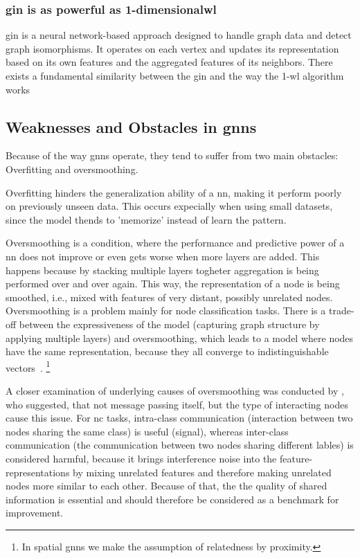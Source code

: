 \subsubsection{\ac{gin} is as powerful as 1-dimensional\ac{wl}}
\Ac{gin} is a neural network-based approach designed to handle graph data and detect graph isomorphisms. It operates on each vertex and updates its representation based on its own features and the aggregated features of its neighbors. There exists a fundamental similarity between the \ac{gin} and the way the 1-\ac{wl} algorithm works
\subsection{Weaknesses and Obstacles in \acp{gnn}}
\label{sec:related:pred:typical}
Because of the way \acp{gnn} operate, they tend to suffer from two main obstacles:
Overfitting and oversmoothing.

Overfitting hinders the generalization ability of a \acf{nn}, making it perform poorly
on previously unseen data. This occurs expecially when using small datasets, since the model thends to 'memorize' instead of learn the pattern.

Oversmoothing is a condition, where the performance and predictive power of a \ac{nn}
does not improve or even gets worse when more layers are added. This happens because
by stacking multiple layers  togheter aggregation is being performed over and over again.
This way, the representation of a node is being smoothed, i.e., mixed with features of
very distant, possibly unrelated nodes. Oversmoothing is a problem mainly for node classification tasks. There is a trade-off between the expressiveness of the model (capturing graph structure by applying multiple layers) and oversmoothing, which leads
to a model where nodes have the same representation, because they all converge to indistinguishable vectors~\cite{Zhou2020,Hasanzadeh2020}.%
\footnote{In spatial \acp{gnn} we make the assumption of relatedness by proximity.}

A closer examination of underlying causes of oversmoothing was conducted by \citet{Chen2020}, who suggested, that not message passing itself, but the type of interacting nodes cause this issue.
For \acf{nc} tasks, intra-class communication (interaction between two nodes sharing the same class) is useful (signal), whereas inter-class communication (the communication between two nodes sharing different lables) is considered harmful, because it brings interference noise into the feature-representations by mixing unrelated features and therefore making unrelated nodes more similar to each other. Because of that, the the quality of shared information is essential and should therefore be considered as a benchmark for improvement.


